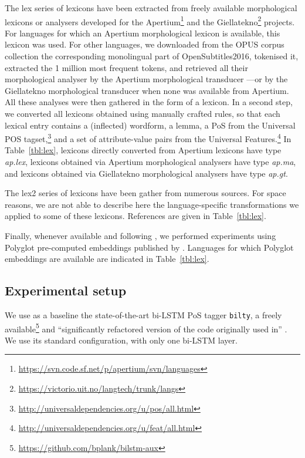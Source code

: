 \documentclass[11pt,letterpaper]{article}
\begin{document}
The {\sc lex} series of lexicons have been extracted from freely available morphological lexicons or analysers developed
for the Apertium\footnote{\url{https://svn.code.sf.net/p/apertium/svn/languages}} and the
Giellatekno\footnote{\url{https://victorio.uit.no/langtech/trunk/langs}} projects. For languages for which an Apertium
morphological lexicon is available, this lexicon was used. For other languages, we downloaded from the OPUS corpus
collection the corresponding monolingual part of OpenSubtitles2016, tokenised it, extracted the 1 million most frequent
tokens, and retrieved all their morphological analyser by the Apertium morphological transducer ---or by the Giellatekno
morphological transducer when none was available from Apertium. All these analyses were then gathered in the form of a
lexicon. In a second step, we converted all lexicons obtained using manually crafted rules, so that each lexical entry
contains a (inflected) wordform, a lemma, a PoS from the Universal POS
tagset,\footnote{\url{http://universaldependencies.org/u/pos/all.html}} and a set of attribute-value pairs from the
Universal Features.\footnote{\url{http://universaldependencies.org/u/feat/all.html}} In Table~\ref{tbl:lex}, lexicons
directly converted from Apertium lexicons have type {\em ap.lex}, lexicons obtained via Apertium morphological analysers
have type {\em ap.ma}, and lexicons obtained via Giellatekno morphological analysers
have type {\em ap.gt}.

The {\sc lex2} series of lexicons have been gather from numerous sources. For space reasons, we are not able to describe
here the language-specific transformations we applied to some of these lexicons. References are given in
Table~\ref{tbl:lex}.

Finally, whenever available and following \citet{plank16}, we performed experiments using Polyglot pre-computed
embeddings published by \citet{alrfou13}. Languages for which Polyglot embeddings are available are indicated in Table~\ref{tbl:lex}.

\begin{table}
\caption{}\label{tbl:lex}
\end{table}

\subsection{Experimental setup}

We use as a baseline the state-of-the-art bi-LSTM PoS tagger \texttt{bilty}, a freely
available\footnote{\url{https://github.com/bplank/bilstm-aux}} and ``significantly refactored version of the code
originally used in'' \cite{plank16}. We use its standard configuration, with only one bi-LSTM layer.
\end{document}
